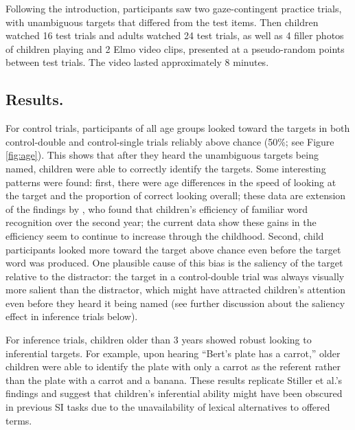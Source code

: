 \documentclass[10pt,letterpaper]{article}
\begin{document}
Following the introduction, participants saw two gaze-contingent practice trials, with unambiguous targets that differed from the test items. Then children watched 16 test trials and adults watched 24 test trials, as well as 4 filler photos of children playing and 2 Elmo video clips, presented at a pseudo-random points between test trials. The video lasted approximately 8 minutes.

\subsection{Results.}

For control trials, participants of all age groups looked toward the targets in both control-double and control-single trials reliably above chance (50\%; see Figure \ref{fig:age}). This shows that after they heard the unambiguous targets being named, children were able to correctly identify the targets. Some interesting patterns were found: first, there were age differences in the speed of looking at the target and the proportion of correct looking overall; these data are extension of the findings by , who found that children's efficiency of familiar word recognition over the second year; the current data show these gains in the efficiency seem to continue to increase through the childhood. Second, child participants looked more toward the target above chance even before the target word was produced. One plausible cause of this bias is the saliency of the target relative to the distractor: the target in a control-double trial was always visually more salient than the distractor, which might have attracted children's attention even before they heard it being named (see further discussion about the saliency effect in inference trials below). 

For inference trials, children older than 3 years showed robust looking to inferential targets. For example, upon hearing ``Bert's plate has a carrot,'' older children were able to identify the plate with only a carrot as the referent rather than the plate with a carrot and a banana. These results replicate Stiller et al.'s findings and suggest that children's inferential ability might have been obscured in previous SI tasks due to the unavailability of lexical alternatives to offered terms.
\end{document}
